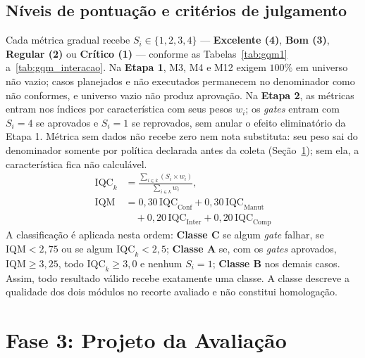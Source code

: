 \documentclass[conference]{model/IEEEtran}%
\newif\ifentregafinal  \entregafinaltrue
\begin{document}
\subsection{Níveis de pontuação e critérios de julgamento}\label{sec:julgcrit}
Cada métrica gradual recebe $S_i \in \{1,2,3,4\}$ --- \textbf{Excelente (4)}, \textbf{Bom (3)}, \textbf{Regular (2)} ou \textbf{Crítico (1)} --- conforme as Tabelas~\ref{tab:gqm1} a~\ref{tab:gqm_interacao}. Na \textbf{Etapa 1}, M3, M4 e M12 exigem $100\%$ em universo não vazio; casos planejados e não executados permanecem no denominador como não conformes, e universo vazio não produz aprovação. Na \textbf{Etapa 2}, as métricas entram nos índices por característica com seus pesos $w_i$; os \textit{gates} entram com $S_i=4$ se aprovados e $S_i=1$ se reprovados, sem anular o efeito eliminatório da Etapa 1. Métrica sem dados não recebe zero nem nota substituta: seu peso sai do denominador somente por política declarada antes da coleta (Seção~\ref{sec:fase3}); sem ela, a característica fica não calculável.
\begin{equation}\label{eq:iqm}
\begin{aligned}
\text{IQC}_k &= \frac{\sum_{i \in k} (S_i \times w_i)}{\sum_{i \in k} w_i}, \\
\text{IQM} &= 0{,}30\,\text{IQC}_{\text{Conf}} + 0{,}30\,\text{IQC}_{\text{Manut}} \\
           &\quad + 0{,}20\,\text{IQC}_{\text{Inter}} + 0{,}20\,\text{IQC}_{\text{Comp}}
\end{aligned}
\end{equation}
A classificação é aplicada nesta ordem: \textbf{Classe C} se algum \textit{gate} falhar, se $\text{IQM} < 2{,}75$ ou se algum $\text{IQC}_k < 2{,}5$; \textbf{Classe A} se, com os \textit{gates} aprovados, $\text{IQM} \ge 3{,}25$, todo $\text{IQC}_k \ge 3{,}0$ e nenhum $S_i = 1$; \textbf{Classe B} nos demais casos. Assim, todo resultado válido recebe exatamente uma classe. A classe descreve a qualidade dos dois módulos no recorte avaliado e não constitui homologação.

\ifentregafinal

\section{Fase 3: Projeto da Avaliação}\label{sec:fase3}
\end{document}
